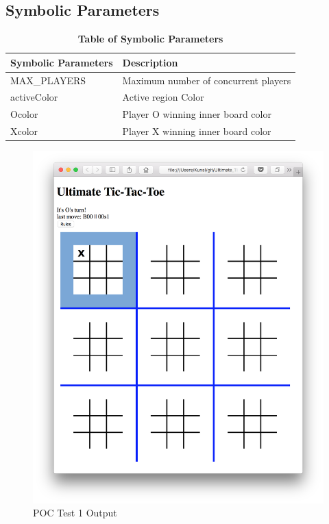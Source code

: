 \documentclass[12pt, titlepage]{article}
\begin{document}
\subsection{Symbolic Parameters}

\begin{table}[h]
\caption{\textbf{Table of Symbolic Parameters}} \label{TableSP}

\begin{tabularx}{\textwidth}{p{5cm}X}
\toprule
\textbf{Symbolic Parameters} & \textbf{Description} \\
\midrule
MAX\_PLAYERS & Maximum number of concurrent players\\
activeColor & Active region Color\\
Ocolor &Player O winning inner board color\\
Xcolor & Player X winning inner board color\\
\bottomrule
\end{tabularx}

\end{table}


\begin{figure}
  \includegraphics[width=\linewidth]{Figures/Test1-output.png}
  \caption{POC Test 1 Output}
  \label{fig:Test1_output}
\end{figure}
\end{document}
